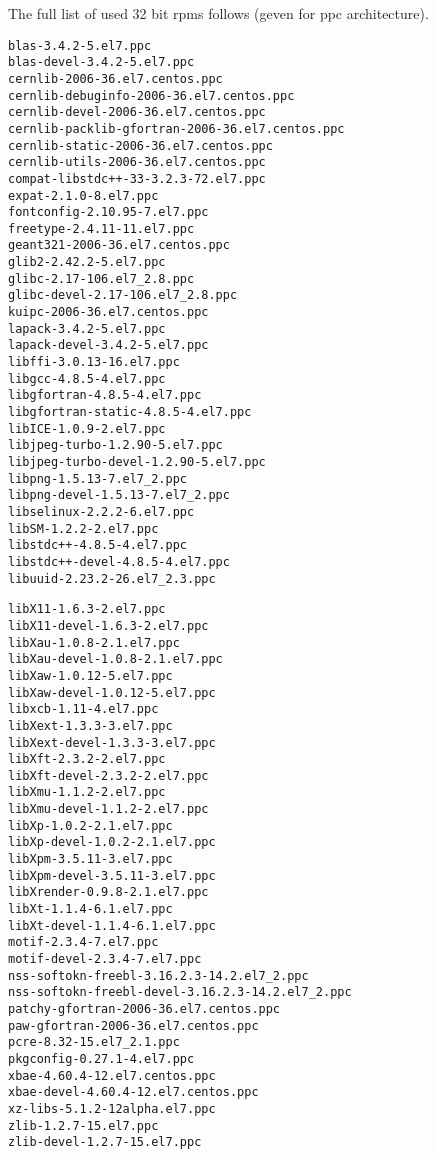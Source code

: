 The full list of used 32 bit rpms follows (geven for ppc architecture).


\begin{minipage}{0.5\textwidth} 
\begin{Verbatim}[fontsize=\tiny]
blas-3.4.2-5.el7.ppc
blas-devel-3.4.2-5.el7.ppc
cernlib-2006-36.el7.centos.ppc
cernlib-debuginfo-2006-36.el7.centos.ppc
cernlib-devel-2006-36.el7.centos.ppc
cernlib-packlib-gfortran-2006-36.el7.centos.ppc
cernlib-static-2006-36.el7.centos.ppc
cernlib-utils-2006-36.el7.centos.ppc
compat-libstdc++-33-3.2.3-72.el7.ppc
expat-2.1.0-8.el7.ppc
fontconfig-2.10.95-7.el7.ppc
freetype-2.4.11-11.el7.ppc
geant321-2006-36.el7.centos.ppc
glib2-2.42.2-5.el7.ppc
glibc-2.17-106.el7_2.8.ppc
glibc-devel-2.17-106.el7_2.8.ppc
kuipc-2006-36.el7.centos.ppc
lapack-3.4.2-5.el7.ppc
lapack-devel-3.4.2-5.el7.ppc
libffi-3.0.13-16.el7.ppc
libgcc-4.8.5-4.el7.ppc
libgfortran-4.8.5-4.el7.ppc
libgfortran-static-4.8.5-4.el7.ppc
libICE-1.0.9-2.el7.ppc
libjpeg-turbo-1.2.90-5.el7.ppc
libjpeg-turbo-devel-1.2.90-5.el7.ppc
libpng-1.5.13-7.el7_2.ppc
libpng-devel-1.5.13-7.el7_2.ppc
libselinux-2.2.2-6.el7.ppc
libSM-1.2.2-2.el7.ppc
libstdc++-4.8.5-4.el7.ppc
libstdc++-devel-4.8.5-4.el7.ppc
libuuid-2.23.2-26.el7_2.3.ppc
\end{Verbatim}
\end{minipage}
\begin{minipage}{0.5\textwidth} 
\begin{Verbatim}[fontsize=\tiny]
libX11-1.6.3-2.el7.ppc
libX11-devel-1.6.3-2.el7.ppc
libXau-1.0.8-2.1.el7.ppc
libXau-devel-1.0.8-2.1.el7.ppc
libXaw-1.0.12-5.el7.ppc
libXaw-devel-1.0.12-5.el7.ppc
libxcb-1.11-4.el7.ppc
libXext-1.3.3-3.el7.ppc
libXext-devel-1.3.3-3.el7.ppc
libXft-2.3.2-2.el7.ppc
libXft-devel-2.3.2-2.el7.ppc
libXmu-1.1.2-2.el7.ppc
libXmu-devel-1.1.2-2.el7.ppc
libXp-1.0.2-2.1.el7.ppc
libXp-devel-1.0.2-2.1.el7.ppc
libXpm-3.5.11-3.el7.ppc
libXpm-devel-3.5.11-3.el7.ppc
libXrender-0.9.8-2.1.el7.ppc
libXt-1.1.4-6.1.el7.ppc
libXt-devel-1.1.4-6.1.el7.ppc
motif-2.3.4-7.el7.ppc
motif-devel-2.3.4-7.el7.ppc
nss-softokn-freebl-3.16.2.3-14.2.el7_2.ppc
nss-softokn-freebl-devel-3.16.2.3-14.2.el7_2.ppc
patchy-gfortran-2006-36.el7.centos.ppc
paw-gfortran-2006-36.el7.centos.ppc
pcre-8.32-15.el7_2.1.ppc
pkgconfig-0.27.1-4.el7.ppc
xbae-4.60.4-12.el7.centos.ppc
xbae-devel-4.60.4-12.el7.centos.ppc
xz-libs-5.1.2-12alpha.el7.ppc
zlib-1.2.7-15.el7.ppc
zlib-devel-1.2.7-15.el7.ppc
\end{Verbatim}
\end{minipage}

